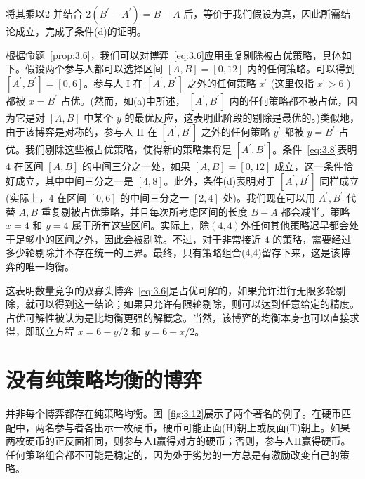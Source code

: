 将其乘以$ 2$ 并结合 \(2\left( {{B}^{\prime } - {A}^{\prime }}\right)  = B - A\) 后，等价于我们假设为真，因此所需结论成立，完成了条件(d)的证明。

根据命题~\ref{prop:3.6}，我们可以对博弈~\eqref{eq:3.6}应用重复剔除被占优策略，具体如下。假设两个参与人都可以选择区间 \(\left\lbrack  {A,B}\right\rbrack   = \left\lbrack  {0,{12}}\right\rbrack\) 内的任何策略。可以得到 \(\left\lbrack  {{A}^{\prime },{B}^{\prime }}\right\rbrack   = \left\lbrack  {0,6}\right\rbrack\)。参与人 I 在 \(\left\lbrack  {{A}^{\prime },{B}^{\prime }}\right\rbrack\) 之外的任何策略 \({x}^{\prime }\) (这里仅指 \({x}^{\prime } > 6\) )都被 \(x = {B}^{\prime }\) 占优。(然而，如(a)中所述， \(\left\lbrack  {{A}^{\prime },{B}^{\prime }}\right\rbrack\) 内的任何策略都不被占优，因为它是对 \(\left\lbrack  {A,B}\right\rbrack\) 中某个 \(y\) 的最优反应，这表明此阶段的剔除是最优的。)类似地，由于该博弈是对称的，参与人 II 在 \(\left\lbrack  {{A}^{\prime },{B}^{\prime }}\right\rbrack\) 之外的任何策略 \({y}^{\prime }\) 都被 \(y = {B}^{\prime }\) 占优。我们剔除这些被占优策略，使得新的策略集将是 \(\left\lbrack  {{A}^{\prime },{B}^{\prime }}\right\rbrack\)。条件~\eqref{eq:3.8}表明 4 在区间 \(\left\lbrack  {A,B}\right\rbrack\) 的中间三分之一处，如果 \(\left\lbrack  {A,B}\right\rbrack   = \left\lbrack  {0,{12}}\right\rbrack\) 成立，这一条件恰好成立，其中中间三分之一是 \(\left\lbrack  {4,8}\right\rbrack\)。此外，条件(d)表明对于 \(\left\lbrack  {{A}^{\prime },{B}^{\prime }}\right\rbrack\) 同样成立(实际上，4 在区间 \(\left\lbrack  {0,6}\right\rbrack\) 的中间三分之一 \(\left\lbrack  {2,4}\right\rbrack\) 处)。我们现在可以用 \({A}^{\prime },{B}^{\prime }\) 代替 \(A,B\) 重复剔被占优策略，并且每次所考虑区间的长度 \(B - A\) 都会减半。策略 \(x = 4\) 和 \(y = 4\) 属于所有这些区间。实际上，除$(4,4)$外任何其他策略迟早都会处于足够小的区间之外，因此会被剔除。不过，对于非常接近 \(4\) 的策略，需要经过多少轮剔除并不存在统一的上界。最终，只有策略组合(4,4)留存下来，这是该博弈的唯一均衡。

这表明数量竞争的双寡头博弈~\eqref{eq:3.6}是占优可解的，如果允许进行无限多轮剔除，就可以得到这一结论；如果只允许有限轮剔除，则可以达到任意给定的精度。占优可解性被认为是比均衡更强的解概念。当然，该博弈的均衡本身也可以直接求得，即联立方程 \(x = 6 - y/2\) 和 \(y = 6 - x/2\)。

\section{没有纯策略均衡的博弈}

并非每个博弈都存在纯策略均衡。图~\ref{fig:3.12}展示了两个著名的例子。在硬币匹配中，两名参与者各出示一枚硬币，硬币可能正面(H)朝上或反面(T)朝上。如果两枚硬币的正反面相同，则参与人I赢得对方的硬币；否则，参与人II赢得硬币。任何策略组合都不可能是稳定的，因为处于劣势的一方总是有激励改变自己的策略。

